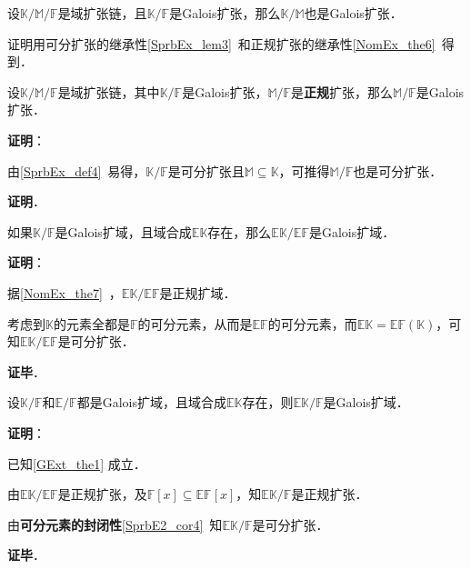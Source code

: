 \begin{theorem}{}
设$\mathbb{K}/\mathbb{M}/\mathbb{F}$是域扩张链，且$\mathbb{K}/\mathbb{F}$是Galois扩张，那么$\mathbb{K}/\mathbb{M}$也是Galois扩张．
\end{theorem}

证明用可分扩张的继承性\autoref{SprbEx_lem3}~和正规扩张的继承性\autoref{NomEx_the6}~得到．

\begin{theorem}{}
设$\mathbb{K}/\mathbb{M}/\mathbb{F}$是域扩张链，其中$\mathbb{K}/\mathbb{F}$是Galois扩张，$\mathbb{M}/\mathbb{F}$是\textbf{正规}扩张，那么$\mathbb{M}/\mathbb{F}$是Galois扩张．
\end{theorem}

\textbf{证明}：

由\autoref{SprbEx_def4}~易得，$\mathbb{K}/\mathbb{F}$是可分扩张且$\mathbb{M}\subseteq\mathbb{K}$，可推得$\mathbb{M}/\mathbb{F}$也是可分扩张．

\textbf{证明}．

\begin{theorem}{}\label{GExt_the1}
如果$\mathbb{K}/\mathbb{F}$是Galois扩域，且域合成$\mathbb{EK}$存在，那么$\mathbb{EK}/\mathbb{EF}$是Galois扩域．
\end{theorem}

\textbf{证明}：

据\autoref{NomEx_the7}~，$\mathbb{EK}/\mathbb{EF}$是正规扩域．

考虑到$\mathbb{K}$的元素全都是$\mathbb{F}$的可分元素，从而是$\mathbb{EF}$的可分元素，而$\mathbb{EK}=\mathbb{EF}(\mathbb{K})$，可知$\mathbb{EK}/\mathbb{EF}$是可分扩张．

\textbf{证毕}．



\begin{theorem}{}
设$\mathbb{K}/\mathbb{F}$和$\mathbb{E}/\mathbb{F}$都是Galois扩域，且域合成$\mathbb{EK}$存在，则$\mathbb{EK}/\mathbb{F}$是Galois扩域．
\end{theorem}

\textbf{证明}：

已知\autoref{GExt_the1} 成立．

由$\mathbb{EK}/\mathbb{EF}$是正规扩张，及$\mathbb{F}[x]\subseteq\mathbb{EF}[x]$，知$\mathbb{EK}/\mathbb{F}$是正规扩张．

由\textbf{可分元素的封闭性}\autoref{SprbE2_cor4}~知$\mathbb{EK}/\mathbb{F}$是可分扩张．

\textbf{证毕}．




